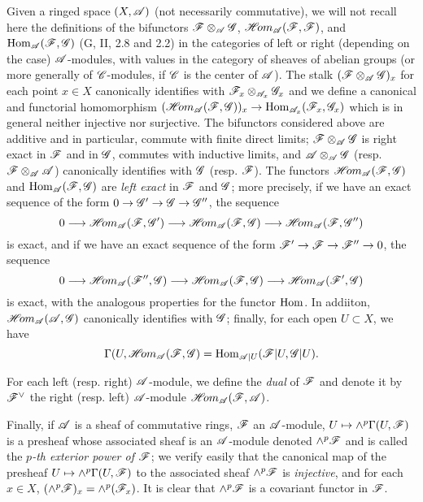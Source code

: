 \begin{env}[4.1.5]
\label{0.4.1.5}
Given a ringed space $(X,\mathscr{A})$ (not necessarily commutative), we will not
recall here the definitions of the bifunctors $\mathscr{F}\otimes_\mathscr{A}\mathscr{G}$,
$\mathscr{H}\!{om}_\mathscr{A}(\mathscr{F},\mathscr{F})$, and ${\mathop{\mathrm{Hom}}\nolimits}_\mathscr{A}(\mathscr{F},\mathscr{G})$
(G, II, 2.8 and 2.2) in the categories of left or right (depending on the case)
$\mathscr{A}$-modules, with values in the category of sheaves of abelian groups (or
more generally of $\mathscr{C}$-modules, if $\mathscr{C}$ is the center of $\mathscr{A}$). The
stalk $(\mathscr{F}\otimes_\mathscr{A}\mathscr{G})_x$ for each point $x\in X$ canonically
identifies with $\mathscr{F}_x\otimes_{\mathscr{A}_x}\mathscr{G}_x$ and we define a canonical
and functorial homomorphism
$(\mathscr{H}\!{om}_\mathscr{A}(\mathscr{F},\mathscr{G}))_x\to{\mathop{\mathrm{Hom}}\nolimits}_{\mathscr{A}_x}(\mathscr{F}_x,\mathscr{G}_x)$ which is
in general neither injective nor surjective. The bifunctors considered above are
additive and in particular, commute with finite direct limits;
$\mathscr{F}\otimes_\mathscr{A}\mathscr{G}$ is right exact in $\mathscr{F}$ and in $\mathscr{G}$,
commutes with inductive limits, and $\mathscr{A}\otimes_\mathscr{A}\mathscr{G}$
(resp. $\mathscr{F}\otimes_\mathscr{A}\mathscr{A}$) canonically identifies with $\mathscr{G}$
(resp. $\mathscr{F}$). The functors $\mathscr{H}\!{om}_\mathscr{A}(\mathscr{F},\mathscr{G})$ and
${\mathop{\mathrm{Hom}}\nolimits}_\mathscr{A}(\mathscr{F},\mathscr{G})$ are \emph{left exact} in $\mathscr{F}$ and $\mathscr{G}$;
more precisely, if we have an exact sequence of the form
$0\to\mathscr{G}'\to\mathscr{G}\to\mathscr{G}''$, the sequence
\[
  0\longrightarrow\mathscr{H}\!{om}_\mathscr{A}(\mathscr{F},\mathscr{G}')\longrightarrow
  \mathscr{H}\!{om}_\mathscr{A}(\mathscr{F},\mathscr{G})\longrightarrow\mathscr{H}\!{om}_\mathscr{A}(\mathscr{F},\mathscr{G}'')
\]
is exact, and if we have an exact sequence of the form
$\mathscr{F}'\to\mathscr{F}\to\mathscr{F}''\to 0$, the sequence
\[
  0\longrightarrow\mathscr{H}\!{om}_\mathscr{A}(\mathscr{F}'',\mathscr{G})\longrightarrow
  \mathscr{H}\!{om}_\mathscr{A}(\mathscr{F},\mathscr{G})\longrightarrow\mathscr{H}\!{om}_\mathscr{A}(\mathscr{F}',\mathscr{G})
\]
is exact, with the analogous properties for the functor ${\mathop{\mathrm{Hom}}\nolimits}$. In addiiton,
$\mathscr{H}\!{om}_\mathscr{A}(\mathscr{A},\mathscr{G})$ canonically identifies with $\mathscr{G}$; finally,
for each open $U\subset X$, we have
\[
  \Gamma(U,\mathscr{H}\!{om}_\mathscr{A}(\mathscr{F},\mathscr{G})={\mathop{\mathrm{Hom}}\nolimits}_{\mathscr{A}|U}(\mathscr{F}|U,\mathscr{G}|U).
\]

For each left (resp. right) $\mathscr{A}$-module, we define the \emph{dual} of
$\mathscr{F}$ and denote it by ${\mathscr{F}}^\vee$ the right (resp. left) $\mathscr{A}$-module
$\mathscr{H}\!{om}_\mathscr{A}(\mathscr{F},\mathscr{A})$.

Finally, if $\mathscr{A}$ is a sheaf of commutative rings, $\mathscr{F}$ an
$\mathscr{A}$-module, $U\mapsto\wedge^p\Gamma(U,\mathscr{F})$ is a presheaf whose
associated sheaf is an $\mathscr{A}$-module denoted $\wedge^p\mathscr{F}$ and is called
the \emph{$p$-th exterior power of $\mathscr{F}$}; we verify easily that the
canonical map of the presheaf $U\mapsto\wedge^p\Gamma(U,\mathscr{F})$ to the
associated sheaf $\wedge^p\mathscr{F}$ is \emph{injective}, and for each $x\in X$,
$(\wedge^p\mathscr{F})_x=\wedge^p(\mathscr{F}_x)$. It is clear that $\wedge^p\mathscr{F}$ is a
covariant functor in $\mathscr{F}$.
\end{env}


